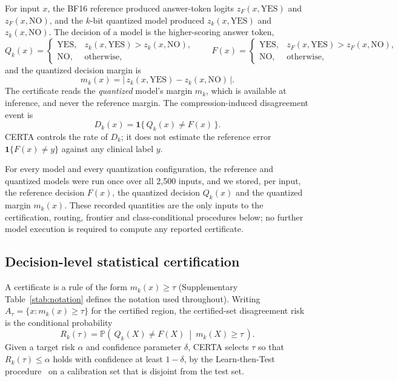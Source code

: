 \documentclass[pdflatex,sn-mathphys-num]{sn-jnl}%
\newcommand{\YES}{\mathrm{YES}}
\newcommand{\NO}{\mathrm{NO}}
\newcommand{\ind}{\mathbf{1}}
\newcommand{\Prob}{\mathbb{P}}
\theoremstyle{thmstyleone}%
\theoremstyle{thmstyletwo}%
\theoremstyle{thmstylethree}%
\begin{document}
For input $x$, the BF16 reference produced answer-token logits $z_F(x,\YES)$ and
$z_F(x,\NO)$, and the $k$-bit quantized model produced $z_k(x,\YES)$ and $z_k(x,\NO)$. The decision
of a model is the higher-scoring answer token,
\begin{equation}
Q_k(x)=
\begin{cases}
\YES, & z_k(x,\YES) > z_k(x,\NO),\\
\NO, & \text{otherwise,}
\end{cases}
\qquad
F(x)=
\begin{cases}
\YES, & z_F(x,\YES) > z_F(x,\NO),\\
\NO, & \text{otherwise,}
\end{cases}
\end{equation}
and the quantized decision margin is
\begin{equation}
m_k(x)=\bigl|\,z_k(x,\YES)-z_k(x,\NO)\,\bigr|.
\end{equation}
The certificate reads the \emph{quantized} model's margin $m_k$, which is available at inference,
and never the reference margin. The compression-induced disagreement event is
\begin{equation}
D_k(x)=\ind\{\,Q_k(x)\neq F(x)\,\}.
\end{equation}
CERTA controls the rate of $D_k$; it does not estimate the reference error
$\ind\{F(x)\neq y\}$ against any clinical label $y$.
 
For every model and every quantization configuration, the reference and quantized models were run
once over all 2{,}500 inputs, and we stored, per input, the reference decision $F(x)$, the
quantized decision $Q_k(x)$ and the quantized margin $m_k(x)$. These recorded quantities are the
only inputs to the certification, routing, frontier and class-conditional procedures below; no
further model execution is required to compute any reported certificate.
 
\subsection*{Decision-level statistical certification}
 
A certificate is a rule of the form $m_k(x)\ge\tau$ (Supplementary Table~\ref{stab:notation} defines the notation used throughout). Writing $A_\tau=\{x:m_k(x)\ge\tau\}$ for the
certified region, the certified-set disagreement risk is the conditional probability
\begin{equation}
R_k(\tau)=\Prob\!\left(\,Q_k(X)\neq F(X)\ \middle|\ m_k(X)\ge\tau\,\right).
\end{equation}
Given a target risk $\alpha$ and confidence parameter $\delta$, CERTA selects $\tau$ so that
$R_k(\tau)\le\alpha$ holds with confidence at least $1-\delta$, by the Learn-then-Test procedure~\cite{angelopoulos2021ltt} on
a calibration set that is disjoint from the test set.
 
\end{document}
